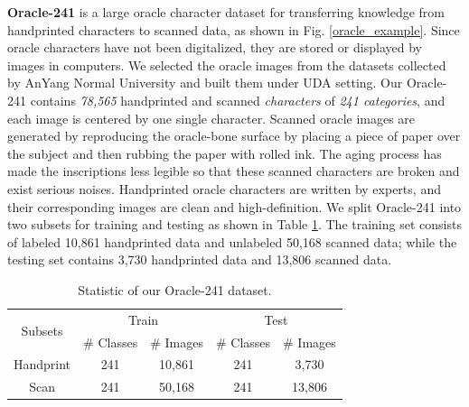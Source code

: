 \documentclass[10pt,journal,compsoc,twocolumn ]{IEEEtran}
\begin{document}
\textbf{Oracle-241} is a large oracle character dataset for transferring knowledge from handprinted characters to scanned data, as shown in Fig. \ref{oracle_example}. Since oracle characters have not been digitalized, they are stored or displayed by images in computers. We selected the oracle images from the datasets collected by AnYang Normal University \cite{anyang} and built them under UDA setting. Our Oracle-241 contains \textit{78,565} handprinted and scanned \textit{characters} of \textit{241 categories}, and each image is centered by one single character. Scanned oracle images are generated by reproducing the oracle-bone surface by placing a piece of paper over the subject and then rubbing the paper with rolled ink. The aging process has made the inscriptions less legible so that these scanned characters are broken and exist serious noises. Handprinted oracle characters are written by experts, and their corresponding images are clean and high-definition. We split Oracle-241 into two subsets for training and testing as shown in Table \ref{tab4}. The training set consists of labeled 10,861 handprinted data and unlabeled 50,168 scanned data; while the testing set contains 3,730 handprinted data and 13,806 scanned data.

\begin{table}[htbp]
\renewcommand\arraystretch{1.1}
\caption{Statistic of our Oracle-241 dataset.}
    \label{tab4}
	\begin{center}
    \small
	\begin{tabular}{c|cc|cc}
    \hline
     \multirow{2}{*}{Subsets} & \multicolumn{2}{c|}{Train} & \multicolumn{2}{c}{Test}\\
        & \# Classes & \# Images & \# Classes   & \# Images \\ \hline \hline
        Handprint & 241 & 10,861 & 241 & 3,730 \\
        Scan & 241 &50,168 & 241 & 13,806 \\ \hline
	\end{tabular}
    \end{center}
\end{table}
\end{document}
